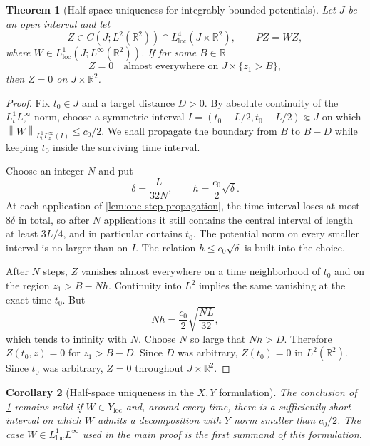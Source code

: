 \documentclass[11pt,oneside]{book}
\newtheorem{theorem}{Theorem}[chapter]
\newtheorem{corollary}[theorem]{Corollary}
\theoremstyle{definition}
\theoremstyle{remark}
\newcommand{\R}{\mathbb R}
\newcommand{\1}{\mathbf 1}
\newcommand{\loc}{\mathrm{loc}}
\newcommand{\norm}[1]{\left\lVert #1\right\rVert}
\begin{document}
\begin{theorem}[Half-space uniqueness for integrably bounded potentials]
\label{thm:halfspace-UC}
Let $J$ be an open interval and let
\begin{equation}
 Z\in C(J;L^2(\R^2))\cap L^4_{\loc}(J\times\R^2),
 \qquad PZ=WZ,                                      \label{eq:halfspace-class}
\end{equation}
where $W\in L^1_{\loc}(J;L^\infty(\R^2))$.  If for some $B\in\R$
\begin{equation}
 Z=0\quad\text{almost everywhere on }J\times\{z_1>B\}, \label{eq:halfspace-zero}
\end{equation}
then $Z=0$ on $J\times\R^2$.
\end{theorem}

\begin{proof}
Fix $t_0\in J$ and a target distance $D>0$.  By absolute continuity of the
$L^1_tL^\infty_z$ norm, choose a symmetric interval
$I=(t_0-L/2,t_0+L/2)\Subset J$ on which
$\norm W_{L^1_tL^\infty_z(I)}\le c_0/2$.  We shall propagate the boundary
from $B$ to $B-D$ while keeping $t_0$ inside the surviving time interval.

Choose an integer $N$ and put
\[
 \delta=\frac{L}{32N},
 \qquad h=\frac{c_0}{2}\sqrt\delta.
\]
At each application of \cref{lem:one-step-propagation}, the time interval
loses at most $8\delta$ in total, so after $N$ applications it still contains
the central interval of length at least $3L/4$, and in particular contains
$t_0$.  The potential norm on every smaller interval is no larger than on
$I$.  The relation $h\le c_0\sqrt\delta$ is built into the choice.

After $N$ steps, $Z$ vanishes almost everywhere on a time neighborhood
of $t_0$ and on the region $z_1>B-Nh$.  Continuity into $L^2$ implies the
same vanishing at the exact time $t_0$.  But
\[
 Nh=\frac{c_0}{2}\sqrt{\frac{NL}{32}},
\]
which tends to infinity with $N$.  Choose $N$ so large that $Nh>D$.
Therefore $Z(t_0,z)=0$ for $z_1>B-D$.  Since $D$ was arbitrary,
$Z(t_0)=0$ in $L^2(\R^2)$.  Since $t_0$ was arbitrary, $Z=0$ throughout
$J\times\R^2$.
\end{proof}

\begin{corollary}[Half-space uniqueness in the $X,Y$ formulation]
\label{cor:halfspace-XY}
The conclusion of \cref{thm:halfspace-UC} remains valid if
$W\in Y_{\loc}$ and, around every time, there is a sufficiently short
interval on which $W$ admits a decomposition with $Y$ norm smaller than
$c_0/2$.  The case $W\in L^1_{\loc}L^\infty$ used in the main proof is the
first summand of this formulation.
\end{corollary}
\end{document}

